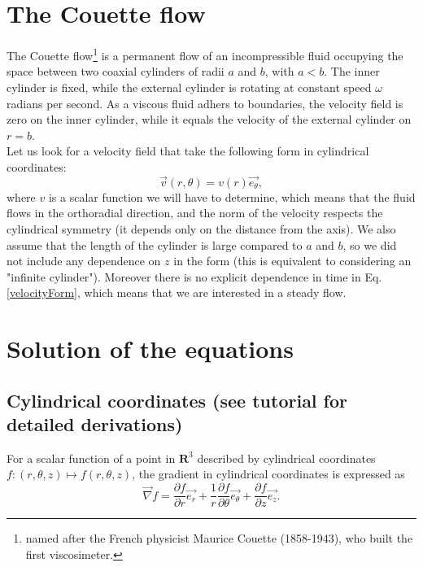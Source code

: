 \documentclass[DIV=12]{article}
\newcommand{\etheta}{\vec{e_\theta}}
\newcommand{\er}{\vec{e_r}}
\newcommand{\ez}{\vec{e_z}}
\begin{document}
\section{The Couette flow}

The Couette flow\footnote{named after the French physicist Maurice Couette (1858-1943), who built the first viscosimeter.} is a permanent flow of an incompressible 
 fluid  occupying the space between two coaxial cylinders of radii $a$ and $b$, with $a < b$. The inner
 cylinder is fixed, while the external cylinder is rotating at constant speed  $\omega$ radians per second. As a viscous fluid adhers
 to boundaries, the velocity field is zero on the inner cylinder, while it equals the velocity of the 
 external cylinder on $r=b$.\\


Let us look for a velocity field that take the following form in  cylindrical coordinates:
 \begin{equation}
 \vec{v}( r, \theta) = v( r ) \etheta,
 \label{velocityForm}
 \end{equation}
 where $v$ is a scalar function we will have to determine, 
which means that the fluid flows in the orthoradial direction, and 
 the norm of the velocity respects the cylindrical symmetry (it depends only on the 
 distance from the axis). We also assume that the length of the cylinder is large compared to $a$ 
 and $b$, so we did not include any dependence on $z$ in the form \label{velocityForm} (this 
 is equivalent to considering an "infinite cylinder"). Moreover there is no explicit dependence in time in Eq. \ref{velocityForm},
 which means that we are interested in a steady flow.\\


\section{Solution of the equations}

\subsection{Cylindrical coordinates (see tutorial for detailed derivations)}



 For a scalar function of a point in ${\mathbf{R}}^3$ described by cylindrical coordinates $f: (r,\theta,z) \mapsto f(r,\theta,z)$, the gradient in cylindrical coordinates 
 is expressed as 
 \begin{equation}
 \boxed{
 \vec{\nabla} f = \frac{\partial f}{\partial r} \er + \frac{1}{r} \frac{\partial f}{\partial \theta} \etheta +   \frac{\partial f}{\partial z} \ez.}
 \label{gradientCyl}
 \end{equation}
\end{document}
